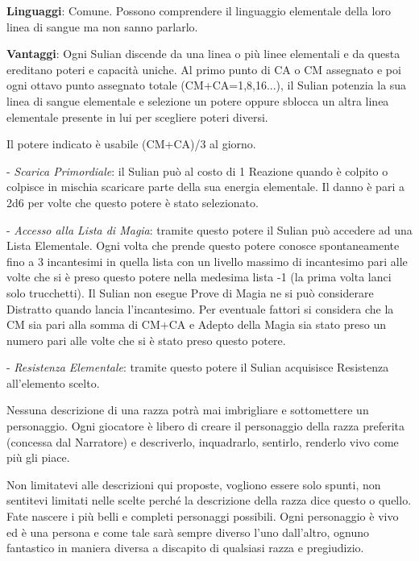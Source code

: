 \begin{multicols}{2}
\textbf{Linguaggi}: Comune. Possono comprendere il linguaggio elementale della loro linea di sangue ma non sanno parlarlo.

\textbf{Vantaggi}: Ogni Sulian discende da una linea o più linee elementali e da questa ereditano poteri e capacità uniche. Al primo punto di CA o CM assegnato e poi ogni ottavo punto assegnato totale (CM+CA=1,8,16...), il Sulian potenzia la sua linea di sangue elementale e selezione un potere oppure sblocca un altra linea elementale presente in lui per scegliere poteri diversi.

Il potere indicato è usabile (CM+CA)/3 al giorno.

- \emph{Scarica Primordiale}: il Sulian può al costo di 1 Reazione quando è colpito o colpisce in mischia scaricare parte della sua energia elementale. Il danno è pari a 2d6 per volte che questo potere è stato selezionato.

- \emph{Accesso alla Lista di Magia}: tramite questo potere il Sulian può accedere ad una Lista Elementale. Ogni volta che prende questo potere conosce spontaneamente fino a 3 incantesimi in quella lista con un livello massimo di incantesimo pari alle volte che si è preso questo potere nella medesima lista -1 (la prima volta lanci solo trucchetti).
Il Sulian non esegue Prove di Magia ne si può considerare Distratto quando lancia l'incantesimo. Per eventuale fattori si considera che la CM sia pari alla somma di CM+CA e Adepto della Magia sia stato preso un numero pari alle volte che si è stato preso questo potere.

- \emph{Resistenza Elementale}: tramite questo potere il Sulian acquisisce Resistenza all'elemento scelto.

\end{multicols}


\begin{changemargin}{0.3cm}{0.3cm}\begin{tcolorbox}[title = Nota sulle Razze]
Nessuna descrizione di una razza potrà mai imbrigliare e sottomettere un personaggio. Ogni giocatore è libero di creare il personaggio della razza preferita (concessa dal Narratore) e descriverlo, inquadrarlo, sentirlo, renderlo vivo come più gli piace.

Non limitatevi alle descrizioni qui proposte, vogliono essere solo spunti, non sentitevi limitati nelle scelte perché la descrizione della razza dice questo o quello.
Fate nascere i più belli e completi personaggi possibili. Ogni personaggio è vivo ed è una persona e come tale sarà sempre diverso l'uno dall'altro, ognuno fantastico in maniera diversa a discapito di qualsiasi razza e pregiudizio.
\end{tcolorbox}\end{changemargin}

